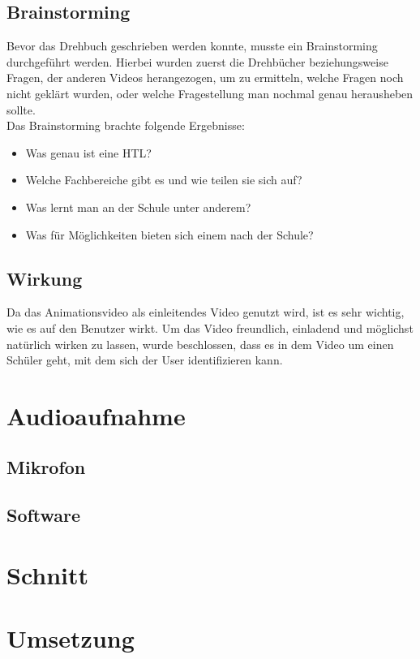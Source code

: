 \subsection{Brainstorming}
Bevor das Drehbuch geschrieben werden konnte, musste ein Brainstorming durchgeführt werden. Hierbei wurden zuerst die Drehbücher beziehungsweise Fragen, der anderen Videos herangezogen, um zu ermitteln, welche Fragen noch nicht geklärt wurden, oder welche Fragestellung man nochmal genau herausheben sollte.
\leavevmode \\
Das Brainstorming brachte folgende Ergebnisse:
\begin{itemize}
\item Was genau ist eine HTL?
\item Welche Fachbereiche gibt es und wie teilen sie sich auf?
\item Was lernt man an der Schule unter anderem?
\item Was für Möglichkeiten bieten sich einem nach der Schule?
\end{itemize}

\subsection{Wirkung}
Da das Animationsvideo als einleitendes Video genutzt wird, ist es sehr wichtig, wie es auf den Benutzer wirkt. Um das Video freundlich, einladend und möglichst natürlich wirken zu lassen, wurde beschlossen, dass es in dem Video um einen Schüler geht, mit dem sich der User identifizieren kann.

\section{Audioaufnahme}

\subsection{Mikrofon}

\subsection{Software}

\section{Schnitt}

\section{Umsetzung}
